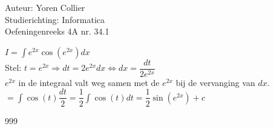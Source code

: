 \documentclass[a4paper]{article}
\newcommand{\asa}{\Leftrightarrow} %
\newcommand{\adR}{\Rightarrow} %
\newcommand{\Lh}{\left(} %
\newcommand{\Rh}{\right)}
\newcommand{\intgrl}{\displaystyle\int} %
\begin{document}
\noindent \large Auteur: Yoren Collier \\
\noindent \large Studierichting: Informatica\\
\noindent \large Oefeningenreeks 4A nr. 34.1\\

\medskip

\normalsize

$ I =  \intgrl e^{2x} \cos \Lh e^{2x} \Rh dx$\\

Stel: $t = e^{2x} \adR dt = 2e^{2x}dx \asa dx = \dfrac{dt}{2e^{2x}} $\\

$e^{2x}$ in de integraal valt weg samen met de $e^{2x}$ bij de vervanging van $dx$.\\

$= \intgrl \cos \Lh t \Rh \dfrac{dt}{2} = \dfrac{1}{2} \intgrl \cos \Lh t \Rh dt = \dfrac{1}{2}  \sin \Lh e^{2x} \Rh +c$\\

\begin{thebibliography}{999}
\end{thebibliography}
\end{document}
